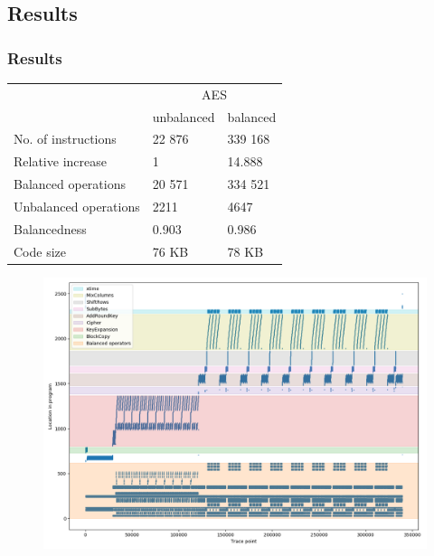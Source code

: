 \documentclass[11pt,t,usepdftitle=false,aspectratio=169]{beamer}
\begin{document}
\subsection{Results}

\begin{frame}[label=results]
  \frametitle{Results}
  \center
  \vfill
  \begin{tabular}{|l|l|l|}
    \hline
    & \multicolumn{2}{c|}{AES} \\
    \cline{2-3}
    & unbalanced & balanced \\
    \cline{2-3}
    No. of instructions & 22 876 & 339 168 \\
    Relative increase & 1 & 14.888 \\
    Balanced operations & 20 571 & 334 521 \\
    Unbalanced operations & 2211 & 4647 \\
    Balancedness      & 0.903 & 0.986 \\
    Code size         & 76 KB & 78 KB \\
    \hline
  \end{tabular}
  \vfill
\end{frame}

\begin{frame}
  \begin{figure}
    \centering
    \includegraphics[height=\textheight]{aes-parts.png}
  \end{figure}
\end{frame}
\end{document}
